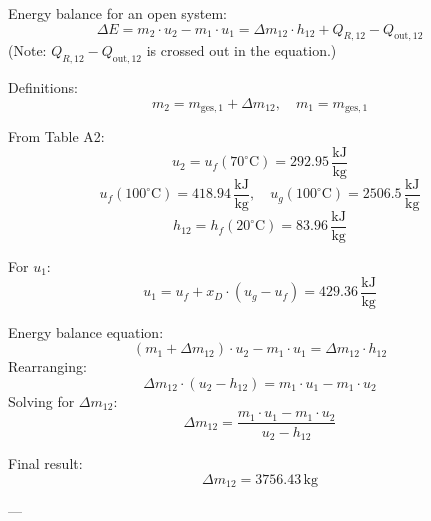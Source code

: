 Energy balance for an open system:  
\[
\Delta E = m_2 \cdot u_2 - m_1 \cdot u_1 = \Delta m_{12} \cdot h_{12} + Q_{R,12} - Q_{\text{out},12}
\]  
(Note: \( Q_{R,12} - Q_{\text{out},12} \) is crossed out in the equation.)  

Definitions:  
\[
m_2 = m_{\text{ges},1} + \Delta m_{12}, \quad m_1 = m_{\text{ges},1}
\]  

From Table A2:  
\[
u_2 = u_f(70^\circ\text{C}) = 292.95 \, \frac{\text{kJ}}{\text{kg}}
\]  
\[
u_f(100^\circ\text{C}) = 418.94 \, \frac{\text{kJ}}{\text{kg}}, \quad u_g(100^\circ\text{C}) = 2506.5 \, \frac{\text{kJ}}{\text{kg}}
\]  
\[
h_{12} = h_f(20^\circ\text{C}) = 83.96 \, \frac{\text{kJ}}{\text{kg}}
\]  

For \( u_1 \):  
\[
u_1 = u_f + x_D \cdot (u_g - u_f) = 429.36 \, \frac{\text{kJ}}{\text{kg}}
\]  

Energy balance equation:  
\[
(m_1 + \Delta m_{12}) \cdot u_2 - m_1 \cdot u_1 = \Delta m_{12} \cdot h_{12}
\]  
Rearranging:  
\[
\Delta m_{12} \cdot (u_2 - h_{12}) = m_1 \cdot u_1 - m_1 \cdot u_2
\]  
Solving for \( \Delta m_{12} \):  
\[
\Delta m_{12} = \frac{m_1 \cdot u_1 - m_1 \cdot u_2}{u_2 - h_{12}}
\]  

Final result:  
\[
\Delta m_{12} = 3756.43 \, \text{kg}
\]  

---